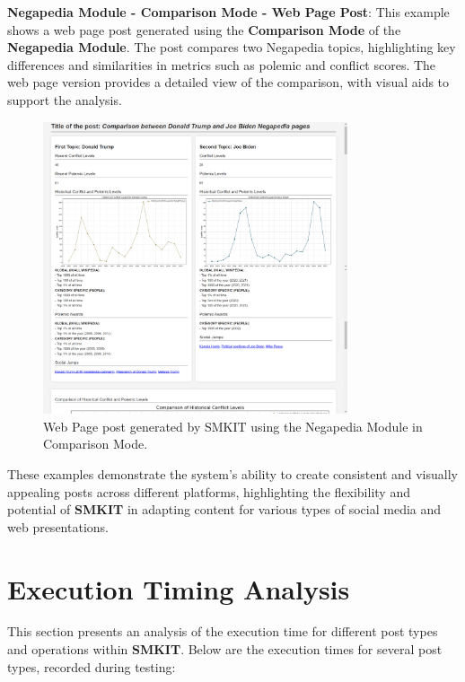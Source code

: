 \textbf{Negapedia Module - Comparison Mode - Web Page Post}:  
This example shows a web page post generated using the \textbf{Comparison Mode} of the \textbf{Negapedia Module}. The post compares two Negapedia topics, highlighting key differences and similarities in metrics such as polemic and conflict scores. The web page version provides a detailed view of the comparison, with visual aids to support the analysis.

\begin{figure}[H]
    \centering
    \includegraphics[width=0.8\textwidth]{figures/results/negapedia_module/comparison_mode/web_page/web_page_negapedia_comparison_post_screenshot.png}
    \caption{Web Page post generated by SMKIT using the Negapedia Module in Comparison Mode.}
    \label{fig:web_page_negapedia_comparison_post_screenshot}
\end{figure}

These examples demonstrate the system’s ability to create consistent and visually appealing posts across different platforms, highlighting the flexibility and potential of \textbf{SMKIT} in adapting content for various types of social media and web presentations.


\section{Execution Timing Analysis}
\label{sec:execution_timing_analysis}
This section presents an analysis of the execution time \cite{pynative_get_execution_time} for different post types and operations within \textbf{SMKIT}. Below are the execution times for several post types, recorded during testing:

